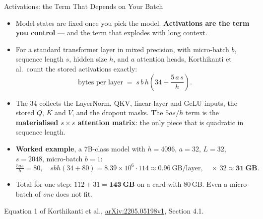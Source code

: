 \begin{frame}{Activations: the Term That Depends on Your Batch}
  \begin{itemize}\footnotesize\itemsep0.35em
    \item[\textcolor{red}{$\blacktriangleright$}] Model states are fixed once you pick the model. \textbf{Activations are the term you control} --- and the term that explodes with long context.
    \item[\textcolor{red}{$\blacktriangleright$}] For a standard transformer layer in mixed precision, with micro-batch $b$, sequence length $s$, hidden size $h$, and $a$ attention heads, Korthikanti et al.\ count the stored activations exactly:
      \[
        \text{bytes per layer} \;=\; s\,b\,h\left(34 + \frac{5\,a\,s}{h}\right).
      \]
    \item[\textcolor{red}{$\blacktriangleright$}] The $34$ collects the LayerNorm, QKV, linear-layer and GeLU inputs, the stored $Q$, $K$ and $V$, and the dropout masks. The $5as/h$ term is the \textbf{materialised $s \times s$ attention matrix}: the only piece that is quadratic in sequence length.
    \item[\textcolor{red}{$\blacktriangleright$}] \textbf{Worked example}, a 7B-class model with $h = 4096$, $a = 32$, $L = 32$, $s = 2048$, micro-batch $b = 1$:
      \[
        \tfrac{5as}{h} = 80, \quad sbh(34+80) = 8.39\times10^{6} \cdot 114 \approx 0.96\ \text{GB/layer}, \quad \times\,32 \approx \mathbf{31\ GB}.
      \]
    \item[\textcolor{red}{$\blacktriangleright$}] Total for one step: $112 + 31 = \mathbf{143\ GB}$ on a card with 80\,GB. Even a micro-batch of \emph{one} does not fit.
  \end{itemize}
  \vspace{0.1em}
  {\scriptsize Equation 1 of Korthikanti et al., \href{https://arxiv.org/abs/2205.05198v1}{arXiv:2205.05198v1}, Section 4.1.}
\end{frame}

